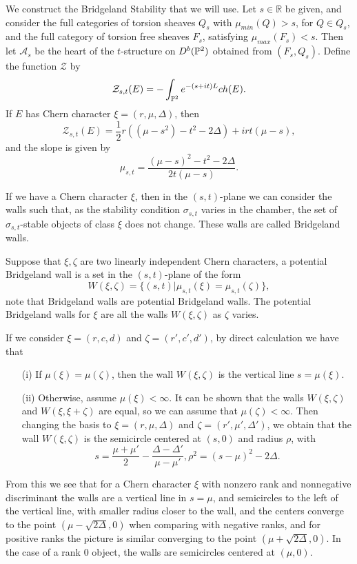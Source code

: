 \documentclass[
	oldfontcommands,
	sumario=abnt-6027-2012,
	12pt,			%
	openright,		%
	oneside,		%
	a4paper,		%
	english,		%
	brazil			%
	]{imecc-unicamp}
\begin{document}
We construct the Bridgeland Stability that we will use. Let $s\in \mathbb R$ be given, and consider the full categories of torsion sheaves $Q_s$ with $\mu_{min}(Q)>s$, for $Q\in Q_s$, and the full category of torsion free sheaves $F_s$, satisfying $\mu_{max}(F_s)<s$. Then let $\mathcal A_s$ be the heart of the $t$-structure on $D^b({\mathbb P}^2)$ obtained from $(F_s, Q_s)$. Define the function $\mathcal Z$ by 
$$
\mathcal Z_{s,t}(E)=-\int_{{\mathbb P}^2}e^{-(s+it)L}ch(E).
$$
If $E$ has Chern character $\xi=(r,\mu,\Delta)$, then 
$$
\mathcal Z_{s,t}(E)=\frac{1}{2}r((\mu-s^2)-t^2-2\Delta)+irt(\mu-s),
$$
and the slope is given by $$
\mu_{s,t}=\frac{(\mu-s)^2-t^2-2\Delta}{2t(\mu-s)}.
$$

If we have a Chern character $\xi$, then in the $(s,t)$-plane we can consider the walls such that, as the stability condition $\sigma_{s,t}$ varies in the chamber, the set of $\sigma_{s,t}$-stable objects of class $\xi$ does not change. These walls are called Bridgeland walls.

Suppose that $\xi,\zeta$ are two linearly independent Chern characters, a potential Bridgeland wall is a set in the $(s,t)$-plane of the form $$
W(\xi,\zeta)=\{(s,t)|\mu_{s,t}(\xi)=\mu_{s,t}(\zeta) \},
$$   
note that Bridgeland walls are potential Bridgeland walls. The potential Bridgeland walls for $\xi$ are all the walls $W(\xi,\zeta)$ as $\zeta$ varies. 

If we consider $\xi=(r,c,d)$ and $\zeta=(r',c',d')$, by direct calculation we have that
\begin{enumerate}
	\item[(i)] If $\mu(\xi)=\mu(\zeta)$, then the wall $W(\xi,\zeta)$ is the vertical line $s=\mu(\xi)$.
	\item[(ii)] Otherwise, assume $\mu(\xi)<\infty$. It can be shown that the walls $W(\xi,\zeta)$ and $W(\xi,\xi+\zeta)$ are equal, so we can assume that $\mu(\zeta)<\infty$. Then changing the basis to $\xi=(r,\mu,\Delta)$ and $\zeta=(r',\mu',\Delta')$, we obtain that the wall $W(\xi,\zeta)$ is the semicircle centered at $(s,0)$ and radius $\rho$, with $$
	s=\frac{\mu+\mu'}{2}-\frac{\Delta-\Delta'}{\mu-\mu'}, \rho^2=(s-\mu)^2-2\Delta.
	$$
	
	
\end{enumerate}

From this we see that for a Chern character $\xi$ with nonzero rank and nonnegative discriminant the walls are a vertical line in $s=\mu$, and semicircles to the left of the vertical line, with smaller radius closer to the wall, and the centers converge to the point $(\mu-\sqrt{2\Delta},0)$ when comparing with negative ranks, and for positive ranks the picture is similar converging to the point $(\mu+\sqrt{2\Delta},0)$. In the case of a rank $0$ object, the walls are semicircles centered at $(\mu,0)$.
\end{document}
